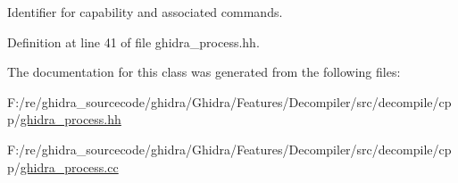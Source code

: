Identifier for capability and associated commands. 



Definition at line 41 of file ghidra\+\_\+process.\+hh.



The documentation for this class was generated from the following files\+:\begin{DoxyCompactItemize}
\item 
F\+:/re/ghidra\+\_\+sourcecode/ghidra/\+Ghidra/\+Features/\+Decompiler/src/decompile/cpp/\mbox{\hyperlink{ghidra__process_8hh}{ghidra\+\_\+process.\+hh}}\item 
F\+:/re/ghidra\+\_\+sourcecode/ghidra/\+Ghidra/\+Features/\+Decompiler/src/decompile/cpp/\mbox{\hyperlink{ghidra__process_8cc}{ghidra\+\_\+process.\+cc}}\end{DoxyCompactItemize}
